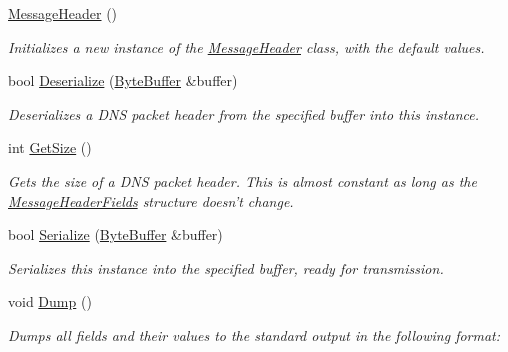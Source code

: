 \begin{DoxyCompactItemize}
\item 
\hyperlink{class_senergy_1_1_dns_1_1_message_header_aa103a12edc759b885f57728c091a84eb}{Message\-Header} ()
\begin{DoxyCompactList}\small\item\em Initializes a new instance of the \hyperlink{class_senergy_1_1_dns_1_1_message_header}{Message\-Header} class, with the default values. \end{DoxyCompactList}\item 
bool \hyperlink{class_senergy_1_1_dns_1_1_message_header_aa54f3864838fe22a4406e0c52a90a010}{Deserialize} (\hyperlink{class_senergy_1_1_byte_buffer}{Byte\-Buffer} \&buffer)
\begin{DoxyCompactList}\small\item\em Deserializes a D\-N\-S packet header from the specified buffer into this instance. \end{DoxyCompactList}\item 
int \hyperlink{class_senergy_1_1_dns_1_1_message_header_a69f4475bc3153926dbb011f37cbbfea9}{Get\-Size} ()
\begin{DoxyCompactList}\small\item\em Gets the size of a D\-N\-S packet header. This is almost constant as long as the \hyperlink{struct_senergy_1_1_dns_1_1_message_header_fields}{Message\-Header\-Fields} structure doesn't change. \end{DoxyCompactList}\item 
bool \hyperlink{class_senergy_1_1_dns_1_1_message_header_ab443595ff8e11a828022f0cc5f3f6fbe}{Serialize} (\hyperlink{class_senergy_1_1_byte_buffer}{Byte\-Buffer} \&buffer)
\begin{DoxyCompactList}\small\item\em Serializes this instance into the specified buffer, ready for transmission. \end{DoxyCompactList}\item 
void \hyperlink{class_senergy_1_1_dns_1_1_message_header_a54b75c73f901b0fc7cf21bed6391aa4e}{Dump} ()
\begin{DoxyCompactList}\small\item\em Dumps all fields and their values to the standard output in the following format\-: \end{DoxyCompactList}\end{DoxyCompactItemize}

